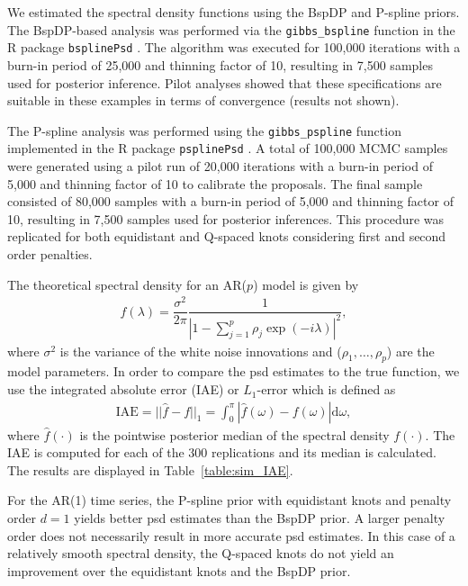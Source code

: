 \documentclass[twocolumn,final]{svjour3}
\begin{document}
We estimated the spectral density functions using the BspDP and P-spline priors.  The BspDP-based  analysis was performed via the \texttt{gibbs\_bspline} function in the \textsf{R} package \texttt{bsplinePsd} \cite{Edwards:bsplinePsd:2018}.  The algorithm was executed for 100,000 iterations with a burn-in period of 25,000 and thinning factor of 10, resulting in 7,500 samples used for posterior inference.  Pilot analyses showed that these specifications are suitable in these examples in terms of convergence (results not shown).  

The P-spline analysis was performed using the \texttt{gibbs\_pspline} function implemented in the \textsf{R} package \texttt{psplinePsd} \citep{psplinepackage}.  A total of 100,000 MCMC samples were generated
using  a pilot run of 20,000 iterations with a burn-in period of 5,000 and thinning factor of 10 to calibrate the proposals.  The final sample consisted of 80,000 samples with a burn-in period of 5,000 and thinning factor of 10, resulting in 7,500 samples used for posterior inferences.  
This procedure was replicated for both equidistant and Q-spaced knots considering first and second order penalties.

The theoretical spectral density for an AR($p$) model is given by
\begin{align*}
f(\lambda) = \dfrac{\sigma^2}{2 \pi} \dfrac{1}{|1-\sum_{j=1}^{p}\rho_j \exp(-i \lambda)|^2},
\end{align*}
where $\sigma^2$ is the variance of the white noise innovations and ($\rho_1, \dots, \rho_p$) are the model parameters.  In order to compare the psd estimates  to the true function, we use the integrated absolute error (IAE) or $L_1$-error which is defined as
\begin{align*}
\text{IAE} = || \widehat{f} - f ||_1 = \int_{0}^{\pi} |\widehat{f}(\omega)-f(\omega)|\text{d}\omega,
\end{align*}
where $\widehat{f}(\cdot)$ is the pointwise posterior median of the spectral density $f(\cdot)$.   The IAE is computed for each of the 300 replications and its median is calculated.  
The results are displayed in Table~\ref{table:sim_IAE}.

For the AR(1) time series, the P-spline prior with equidistant knots and penalty order $d=1$ yields better psd estimates than the BspDP prior.
A larger penalty order does not necessarily result in more accurate psd estimates. In this case of a relatively smooth spectral density, the Q-spaced knots do not yield an improvement over the equidistant knots and the BspDP prior.
\end{document}
